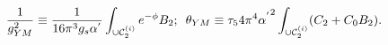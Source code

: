 \begin{equation}
\! \! \! \! \!
\frac{1}{ g^{2}_{YM} } \equiv \frac{1}{16 \pi^3 g_s \alpha^{'}} 
\int_{\cup {\cal C}_{2}^{(i)}}
e^{- \phi} B_2 ; \,\,\,
\theta_{YM} \equiv \tau_5 4 \pi^4 { \alpha^{'}}^2 
\int_{\cup {\cal C}_{2}^{(i)}} (C_2 + C_0 B_2). \label{t}
\end{equation}

